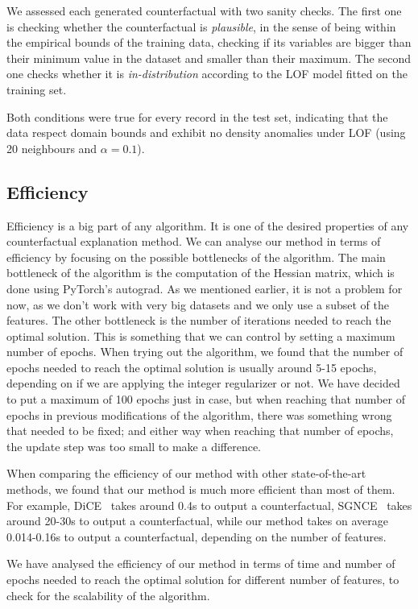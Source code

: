 \documentclass[12pt]{extarticle}
\numberwithin{equation}{section}
\begin{document}
We assessed each generated counterfactual with two sanity checks. The first one is checking whether the counterfactual is \emph{plausible}, in the sense of being within the empirical bounds of the training data, checking if its variables are bigger than their minimum value in the dataset and smaller than their maximum. The second one checks whether it is \emph{in-distribution} according to the LOF model fitted on the training set.

Both conditions were true for every record in the test set, indicating that the data respect domain bounds and exhibit no density anomalies under LOF (using 20 neighbours and $\alpha = 0.1$).

\subsection{Efficiency}\label{sec:efficiency}
Efficiency is a big part of any algorithm. It is one of the desired properties of any counterfactual explanation method. We can analyse our method in terms of efficiency by focusing on the possible bottlenecks of the algorithm. The main bottleneck of the algorithm is the computation of the Hessian matrix, which is done using PyTorch's autograd. As we mentioned earlier, it is not a problem for now, as we don't work with very big datasets and we only use a subset of the features. The other bottleneck is the number of iterations needed to reach the optimal solution. This is something that we can control by setting a maximum number of epochs. When trying out the algorithm, we found that the number of epochs needed to reach the optimal solution is usually around 5-15 epochs, depending on if we are applying the integer regularizer or not. We have decided to put a maximum of 100 epochs just in case, but when reaching that number of epochs in previous modifications of the algorithm, there was something wrong that needed to be fixed; and either way when reaching that number of epochs, the update step was too small to make a difference.

When comparing the efficiency of our method with other state-of-the-art methods, we found that our method is much more efficient than most of them. For example, DiCE~\cite{dice} takes around 0.4s to output a counterfactual, SGNCE~\cite{sgnce} takes around 20-30s to output a counterfactual, while our method takes on average 0.014-0.16s to output a counterfactual, depending on the number of features. 

We have analysed the efficiency of our method in terms of time and number of epochs needed to reach the optimal solution for different number of features, to check for the scalability of the algorithm.
\end{document}
